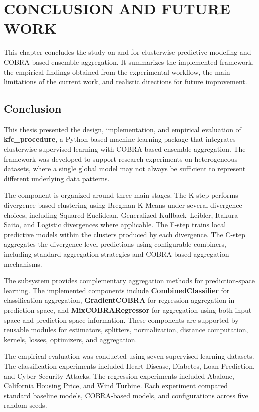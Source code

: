 

\chapter{CONCLUSION AND FUTURE WORK}
\label{ch:conclusion_future_work}

\hs This chapter concludes the study on \KFCProcedure{} and \GradientCOBRA{} for clusterwise predictive modeling and COBRA-based ensemble aggregation. It summarizes the implemented framework, the empirical findings obtained from the experimental workflow, the main limitations of the current work, and realistic directions for future improvement.

\section{Conclusion}
\label{sec:conclusion}

\hs This thesis presented the design, implementation, and empirical evaluation of \textbf{kfc\_procedure}, a Python-based machine learning package that integrates clusterwise supervised learning with COBRA-based ensemble aggregation. The framework was developed to support research experiments on heterogeneous datasets, where a single global model may not always be sufficient to represent different underlying data patterns.

The \KFCProcedure{} component is organized around three main stages. The K-step performs divergence-based clustering using Bregman K-Means under several divergence choices, including Squared Euclidean, Generalized Kullback--Leibler, Itakura--Saito, and Logistic divergences where applicable. The F-step trains local predictive models within the clusters produced by each divergence. The C-step aggregates the divergence-level predictions using configurable combiners, including standard aggregation strategies and COBRA-based aggregation mechanisms.

The \GradientCOBRA{} subsystem provides complementary aggregation methods for prediction-space learning. The implemented components include \textbf{CombinedClassifier} for classification aggregation, \textbf{GradientCOBRA} for regression aggregation in prediction space, and \textbf{MixCOBRARegressor} for aggregation using both input-space and prediction-space information. These components are supported by reusable modules for estimators, splitters, normalization, distance computation, kernels, losses, optimizers, and aggregation.

The empirical evaluation was conducted using seven supervised learning datasets. The classification experiments included Heart Disease, Diabetes, Loan Prediction, and Cyber Security Attacks. The regression experiments included Abalone, California Housing Price, and Wind Turbine. Each experiment compared standard baseline models, COBRA-based models, and \KFCProcedure{} configurations across five random seeds.


